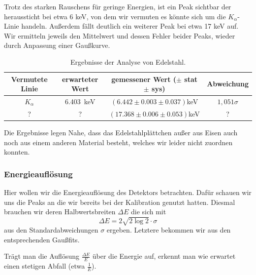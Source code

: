 \documentclass[a4paper,14pt]{article}
\begin{document}
Trotz des starken Rauschens für geringe Energien, ist ein Peak sichtbar der heraussticht bei etwa 6 keV, von dem wir vermuten es könnte sich um die $K_\alpha$-Linie handeln. Außerdem fällt deutlich ein weiterer Peak bei etwa 17 keV auf. Wir ermitteln jeweils den Mittelwert und dessen Fehler beider Peaks, wieder durch Anpassung einer Gaußkurve.

\begin{table}[H]
	\renewcommand{\arraystretch}{1.5}
	\centering
	\begin{tabular}{|c|c|c|c|}
		\hline
		Vermutete Linie & erwarteter Wert & gemessener Wert ($\pm$ stat $\pm$ sys) & Abweichung \\
		\hline
		$K_\alpha$ & \SI{6.403}{keV} & $(6.442 \pm 0.003 \pm 0.037)$keV & $1,051\sigma$ \\
		\cline{1-4}
		 ? & ? & $(17.368 \pm 0.006 \pm 0.053)$keV & ? \\
		\hline
	\end{tabular}
	\caption{Ergebnisse der Analyse von Edelstahl.}
	\label{tab:am_fe_mean}
\end{table}

Die Ergebnisse legen Nahe, dass das Edelstahlplättchen außer aus Eisen auch noch aus einem anderen Material besteht, welches wir leider nicht zuordnen konnten.

\subsubsection{Energieauflösung}
Hier wollen wir die Energieauflösung des Detektors betrachten. Dafür schauen wir uns die Peaks an die wir bereits bei der Kalibration genutzt hatten. Diesmal brauchen wir deren Halbwertsbreiten $\Delta E$ die sich mit
\begin{equation}
	\Delta E = 2 \sqrt{2 \log2} \cdot \sigma
\end{equation}
aus den Standardabweichungen $\sigma$ ergeben. Letztere bekommen wir aus den entsprechenden Gaußfits.

Trägt man die Auflösung $\frac{\Delta E}{E}$ über die Energie auf, erkennt man wie erwartet einen stetigen Abfall (etwa $\frac{1}{E}$).
\end{document}
